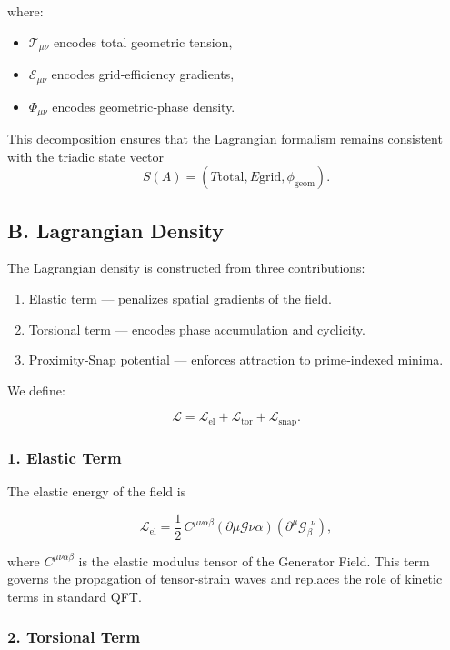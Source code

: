 \documentclass[reprint,amsmath,amssymb,aps,prl,floatfix]{revtex4-2}
\begin{document}
where:
\begin{itemize}
\item \(\mathcal{T}_{\mu\nu}\) encodes total geometric tension,  
\item \(\mathcal{E}_{\mu\nu}\) encodes grid‑efficiency gradients,  
\item \(\Phi_{\mu\nu}\) encodes geometric‑phase density.
\end{itemize}

This decomposition ensures that the Lagrangian formalism remains consistent with the triadic state vector  
\[
S(A) = (T{\mathrm{total}}, E{\mathrm{grid}}, \phi_{\mathrm{geom}}).
\]

\subsection{B. Lagrangian Density}

The Lagrangian density is constructed from three contributions:
\begin{enumerate}
\item Elastic term — penalizes spatial gradients of the field.  
\item Torsional term — encodes phase accumulation and cyclicity.  
\item Proximity‑Snap potential — enforces attraction to prime‑indexed minima.
\end{enumerate}

We define:

\[
\mathcal{L}
=
\mathcal{L}_{\mathrm{el}}
+
\mathcal{L}_{\mathrm{tor}}
+
\mathcal{L}_{\mathrm{snap}}.
\]

\subsubsection{1. Elastic Term}

The elastic energy of the field is

\[
\mathcal{L}_{\mathrm{el}}
=
\frac{1}{2}\,C^{\mu\nu\alpha\beta}
(\partial\mu \mathcal{G}{\nu\alpha})
(\partial^\mu \mathcal{G}_{\beta}^{\ \ \nu}),
\]

where \(C^{\mu\nu\alpha\beta}\) is the elastic modulus tensor of the Generator Field.  
This term governs the propagation of tensor‑strain waves and replaces the role of kinetic terms in standard QFT.

\subsubsection{2. Torsional Term}
\end{document}
